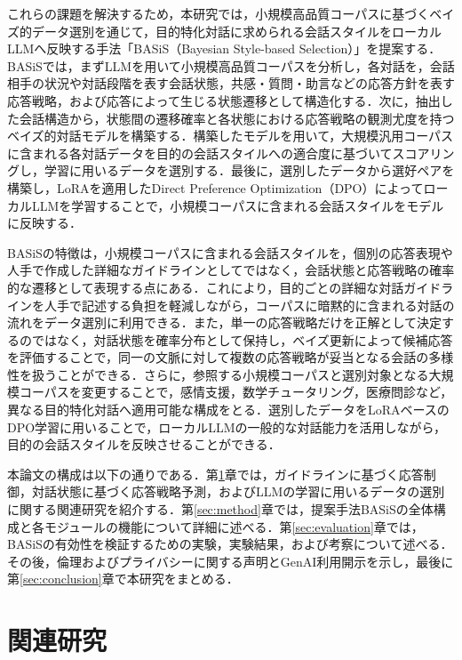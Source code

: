 \documentclass[manuscript,review,anonymous]{acmart}
\begin{document}
これらの課題を解決するため，本研究では，小規模高品質コーパスに基づくベイズ的データ選別を通じて，目的特化対話に求められる会話スタイルをローカルLLMへ反映する手法「BASiS（Bayesian Style-based Selection）」を提案する．BASiSでは，まずLLMを用いて小規模高品質コーパスを分析し，各対話を，会話相手の状況や対話段階を表す会話状態，共感・質問・助言などの応答方針を表す応答戦略，および応答によって生じる状態遷移として構造化する．次に，抽出した会話構造から，状態間の遷移確率と各状態における応答戦略の観測尤度を持つベイズ的対話モデルを構築する．構築したモデルを用いて，大規模汎用コーパスに含まれる各対話データを目的の会話スタイルへの適合度に基づいてスコアリングし，学習に用いるデータを選別する．最後に，選別したデータから選好ペアを構築し，LoRAを適用したDirect Preference Optimization（DPO）によってローカルLLMを学習することで，小規模コーパスに含まれる会話スタイルをモデルに反映する．

BASiSの特徴は，小規模コーパスに含まれる会話スタイルを，個別の応答表現や人手で作成した詳細なガイドラインとしてではなく，会話状態と応答戦略の確率的な遷移として表現する点にある．これにより，目的ごとの詳細な対話ガイドラインを人手で記述する負担を軽減しながら，コーパスに暗黙的に含まれる対話の流れをデータ選別に利用できる．また，単一の応答戦略だけを正解として決定するのではなく，対話状態を確率分布として保持し，ベイズ更新によって候補応答を評価することで，同一の文脈に対して複数の応答戦略が妥当となる会話の多様性を扱うことができる．さらに，参照する小規模コーパスと選別対象となる大規模コーパスを変更することで，感情支援，数学チュータリング，医療問診など，異なる目的特化対話へ適用可能な構成をとる．選別したデータをLoRAベースのDPO学習に用いることで，ローカルLLMの一般的な対話能力を活用しながら，目的の会話スタイルを反映させることができる．

本論文の構成は以下の通りである．第\ref{sec:relwork}章では，ガイドラインに基づく応答制御，対話状態に基づく応答戦略予測，およびLLMの学習に用いるデータの選別に関する関連研究を紹介する．第\ref{sec:method}章では，提案手法BASiSの全体構成と各モジュールの機能について詳細に述べる．第\ref{sec:evaluation}章では，BASiSの有効性を検証するための実験，実験結果，および考察について述べる．その後，倫理およびプライバシーに関する声明とGenAI利用開示を示し，最後に第\ref{sec:conclusion}章で本研究をまとめる．


\section{関連研究}
\label{sec:relwork}
\end{document}
